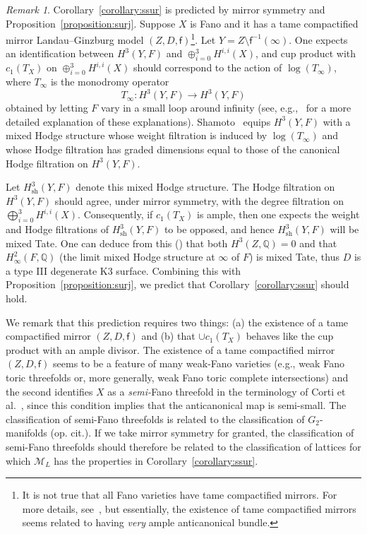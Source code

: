 \documentclass[10pt]{amsart}
\numberwithin{equation}{section}
\theoremstyle{plain}
\theoremstyle{definition}
\theoremstyle{remark}
\newtheorem{remark}[theorem]{Remark}
\begin{document}
\begin{remark}\label{remark:smifano}
  Corollary~\ref{corollary:ssur} is predicted by mirror symmetry and Proposition~\ref{proposition:surj}. Suppose \(X\) is Fano and it has a tame compactified mirror Landau--Ginzburg model \((Z,D,\mathsf{f})\)\footnote{It is not true that all Fano varieties have tame compactified mirrors. For more details, see~\cite{przyjalkowski2022singular}, but essentially, the existence of tame compactified mirrors seems related to having \emph{very} ample anticanonical bundle.}. Let \(Y = Z \setminus \mathsf{f}^{-1}(\infty)\). One expects an identification between \(H^3(Y,F)\) and \(\oplus_{i=0}^3H^{i,i}(X)\), and cup product with \(c_1(T_X)\) on \(\oplus_{i=0}^3 H^{i,i}(X)\) should correspond to the action of \(\log(T_\infty)\), where \(T_\infty\) is the monodromy operator
  \[
    T_\infty \colon H^3(Y,F) \rightarrow H^3(Y,F)
  \]
  obtained by letting \(F\) vary in a small loop around infinity (see, e.g.,~\cite[\S 3.1]{katzarkov2017bogomolov} for a more detailed explanation of these explanations). Shamoto~\cite{shamoto2018hodge} equips \(H^3(Y,F)\) with a mixed Hodge structure whose weight filtration is induced by \(\log(T_\infty)\) and whose Hodge filtration has graded dimensions equal to those of the canonical Hodge filtration on \(H^3(Y,F)\).

  Let \(H^3_{\mathrm{sh}}(Y,F)\) denote this mixed Hodge structure. The Hodge filtration on \(H^3(Y,F)\) should agree, under mirror symmetry, with the degree filtration on \(\bigoplus_{i=0}^3 H^{i,i}(X)\). Consequently, if \(c_1(T_X)\) is ample, then one expects the weight and Hodge filtrations of \(H_{\mathrm{sh}}^3(Y,F)\) to be opposed, and hence \(H^3_\mathrm{sh}(Y,F)\) will be mixed Tate. One can deduce from this (\cite{harder2021hodge}) that both \(H^3(Z,\mathbb{Q}) = 0\) and that \(H^2_\infty(F,\mathbb{Q})\) (the limit mixed Hodge structure at \(\infty\) of \(F\)) is mixed Tate, thus \(D\) is a type III degenerate K3 surface. Combining this with Proposition~\ref{proposition:surj}, we predict that Corollary~\ref{corollary:ssur} should hold.

  We remark that this prediction requires two things: (a) the existence of a tame compactified mirror \((Z,D,\mathsf{f})\) and (b) that \(\cup c_1(T_X)\) behaves like the cup product with an ample divisor. The existence of a tame compactified mirror \((Z,D,\mathsf{f})\) seems to be a feature of many weak-Fano varieties (e.g., weak Fano toric threefolds or, more generally, weak Fano toric complete intersections) and the second identifies \(X\) as a \emph{semi-}Fano threefold in the terminology of Corti et al.~\cite{corti2013asymptotically, corti2015g_2}, since this condition implies that the anticanonical map is semi-small. The classification of semi-Fano threefolds is related to the classification of \(G_2\)-manifolds (op. cit.). If we take mirror symmetry for granted, the classification of semi-Fano threefolds should therefore be related to the classification of lattices for which \(\mathcal{M}_L\) has the properties in Corollary~\ref{corollary:ssur}.
\end{remark}
\end{document}
